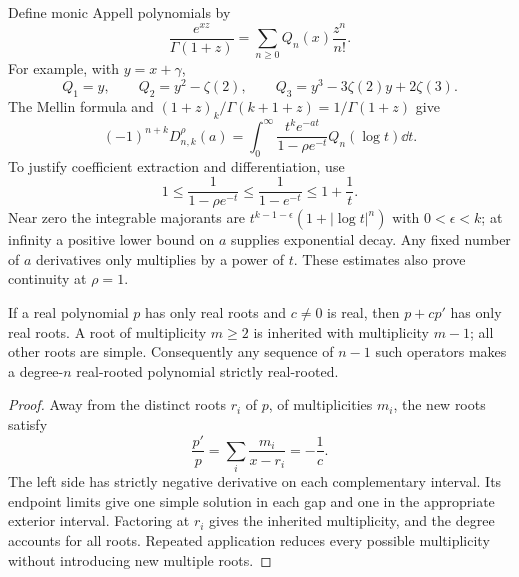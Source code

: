 Define monic Appell polynomials by
\begin{equation}\label{eq:Q-generating}
 \frac{e^{xz}}{\Gamma(1+z)}=\sum_{n\ge0}Q_n(x)\frac{z^n}{n!}.
\end{equation}
For example, with $y=x+\gamma$,
\[
 Q_1=y,\qquad Q_2=y^2-\zeta(2),\qquad
 Q_3=y^3-3\zeta(2)y+2\zeta(3).
\]
The Mellin formula and $(1+z)_k/\Gamma(k+1+z)=1/\Gamma(1+z)$
give
\begin{equation}\label{eq:positive-Laplace}
 (-1)^{n+k}D_{n,k}^{\rho}(a)
 =\int_0^\infty\frac{t^k e^{-at}}{1-\rho e^{-t}}Q_n(\log t)\dd t.
\end{equation}
To justify coefficient extraction and differentiation, use
\[
 1\le\frac1{1-\rho e^{-t}}\le\frac1{1-e^{-t}}\le1+\frac1t.
\]
Near zero the integrable majorants are
$t^{k-1-\epsilon}(1+|\log t|^n)$ with $0<\epsilon<k$;
at infinity a positive lower bound on $a$ supplies exponential decay.
Any fixed number of $a$ derivatives only multiplies by a power of $t$.
These estimates also prove continuity at $\rho=1$.

\begin{lemma}\label{lem:root-operator}
If a real polynomial $p$ has only real roots and $c\ne0$ is real, then
$p+cp'$ has only real roots. A root of multiplicity $m\ge2$ is inherited
with multiplicity $m-1$; all other roots are simple. Consequently any
sequence of $n-1$ such operators makes a degree-$n$ real-rooted polynomial
strictly real-rooted.
\end{lemma}
\begin{proof}
Away from the distinct roots $r_i$ of $p$, of multiplicities $m_i$, the
new roots satisfy
\[
 \frac{p'}p=\sum_i\frac{m_i}{x-r_i}=-\frac1c.
\]
The left side has strictly negative derivative on each complementary
interval. Its endpoint limits give one simple solution in each gap and
one in the appropriate exterior interval. Factoring at $r_i$ gives the
inherited multiplicity, and the degree accounts for all roots.
Repeated application reduces every possible multiplicity without
introducing new multiple roots.
\end{proof}


